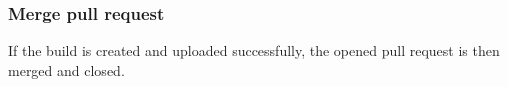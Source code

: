 \documentclass[journal]{IEEEtran}
\begin{document}
\subsubsection*{Merge pull request}
If the build is created and uploaded successfully, the opened pull request is then merged and closed.\\







\end{document}
